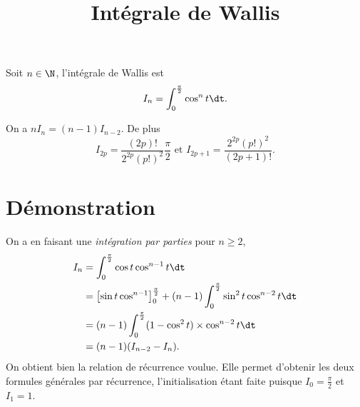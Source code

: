 \documentclass[fontsize=12pt,twoside=false,parskip=half]{scrartcl}
\title{Intégrale de Wallis}
\date{}
\author{}
\begin{document}
\maketitle
   Soit $n \in \N$, l’intégrale de Wallis est 
   \[
      I_n = \int_0^{\frac{\pi}{2}} \cos^n t \dt.
   \]
   \begin{Theoreme}
      On a $nI_n = (n - 1)I_{n - 2}$. De plus
      \[ 
          I_{2p} = \frac{(2p)!}{2^{2p}(p!)^2}\frac{\pi}{2} \text{ et }
          I_{2p + 1} = \frac{2^{2p}(p!)^2}{(2p + 1)!}.
      \]
   \end{Theoreme}
   \section{Démonstration}
      On a en faisant une \emph{intégration par parties} pour $n \geq 2$,
      \begin{align*}
         I_n &= \int_0^{\frac{\pi}{2}} \cos t \cos^{n - 1} t \dt\\
             &= \left[ \sin t \cos^{n - 1}\right]_0^{\frac{\pi}{2}} + (n - 1) \int_0^{\frac{\pi}{2}} \sin^2 t \cos^{n - 2} t \dt\\
             &= (n - 1) \int_0^{\frac{\pi}{2}} (1 - \cos^2 t) \times \cos^{n - 2} t \dt\\
             &= (n - 1) (I_{n - 2} - I_n).
      \end{align*}
      On obtient bien la relation de récurrence voulue. Elle permet d’obtenir les 
      deux formules générales par récurrence, l’initialisation étant faite
      puisque $I_0 = \frac{\pi}{2}$ et $I_1 = 1$.

\end{document}
